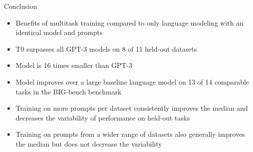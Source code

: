 \documentclass[english]{mlutalk}
\begin{document}
\begin{frame}{Conclusion}
    \begin{itemize}
      \item Benefits of multitask training compared to only language modeling with an identical model and prompts
      \item T0 surpasses all GPT-3 models on 8 of 11 held-out datasets
      \item Model is 16 times smaller than GPT-3
      \item Model improves over a large baseline language model on 13 of 14 comparable tasks in the BIG-bench benchmark
      \item Training on more prompts per dataset consistently improves the median and decreases the variability of performance on held-out tasks
      \item Training on prompts from a wider range of datasets also generally improves the median but does not decrease the variability
    \end{itemize}
\end{frame}

\appendix
\section{\appendixname}

\bibliographyframe
\end{document}
